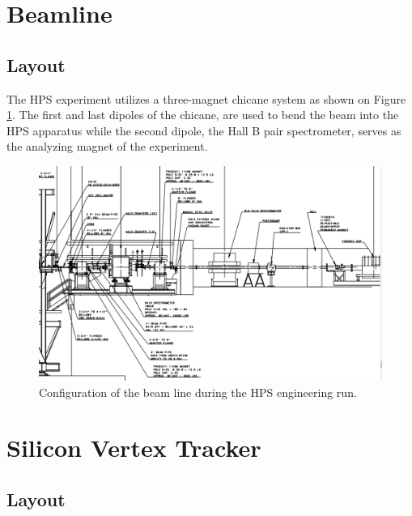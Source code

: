 \section{Beamline}

\subsection{Layout}

The HPS experiment utilizes a three-magnet chicane system as shown on Figure 
\ref{fig:beamline}. The first and last dipoles of the chicane,  are used to bend
the beam into the HPS apparatus while the second dipole, the Hall B pair 
spectrometer, serves as the analyzing magnet of the experiment.  

\begin{figure}
    \centering
    \includegraphics[width=\textwidth]{images/beamline.png}
    \caption{Configuration of the beam line during the HPS engineering run.}
    \label{fig:beamline}
\end{figure}

\section{Silicon Vertex Tracker}

\subsection{Layout}

